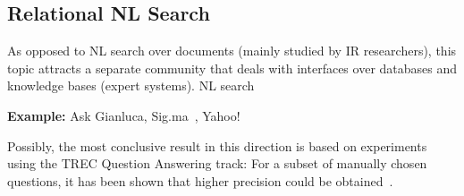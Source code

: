 \subsection{Relational NL Search} 
As opposed to NL search over documents (mainly studied by IR researchers), this topic attracts a separate community that deals with interfaces over databases and knowledge bases (expert systems). NL search 


\textbf{Example:}
Ask Gianluca, Sig.ma~\cite{DBLP:conf/sigir/Chu-CarrollPCFD06}, Yahoo! 


Possibly, the most conclusive result in this direction is based on experiments using the TREC Question Answering track: For a subset of manually chosen questions, it has been shown that higher precision could be obtained~\cite{DBLP:conf/sigir/Chu-CarrollPCFD06}. 

